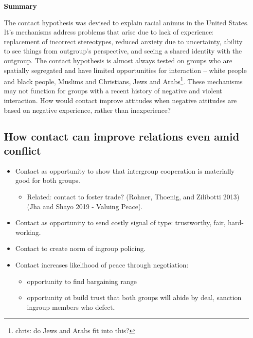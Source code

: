 \documentclass[11pt]{article}
\providecommand{\tightlist}{%
  \setlength{\itemsep}{0pt}\setlength{\parskip}{0pt}}
\begin{document}
\textbf{Summary}

The contact hypothesis was devised to explain racial animus in the
United States. It's mechanisms address problems that arise due to lack
of experience: replacement of incorrect stereotypes, reduced anxiety due
to uncertainty, ability to see things from outgroup's perspective, and
seeing a shared identity with the outgroup. The contact hypothesis is
almost always tested on groups who are spatially segregated and have
limited opportunities for interaction -- white people and black people,
Muslims and Christians, Jews and Arabs\footnote{chris: do Jews and Arabs
  fit into this?}. These mechanisms may not function for groups with a
recent history of negative and violent interaction. How would contact
improve attitudes when negative attitudes are based on negative
experience, rather than inexperience?

\hypertarget{how-contact-can-improve-relations-even-amid-conflict}{%
\subsection{How contact can improve relations even amid
conflict}\label{how-contact-can-improve-relations-even-amid-conflict}}

\begin{itemize}
\item
  Contact as opportunity to show that intergroup cooperation is
  materially good for both groups.

  \begin{itemize}
  \tightlist
  \item
    Related: contact to foster trade? (Rohner, Thoenig, and Zilibotti
    2013) (Jha and Shayo 2019 - Valuing Peace).
  \end{itemize}
\item
  Contact as opportunity to send costly signal of type: trustworthy,
  fair, hard-working.
\item
  Contact to create norm of ingroup policing.
\item
  Contact increases likelihood of peace through negotiation:

  \begin{itemize}
  \tightlist
  \item
    opportunity to find bargaining range
  \item
    opportunity ot build trust that both groups will abide by deal,
    sanction ingroup members who defect.
  \end{itemize}
\end{itemize}
\end{document}
